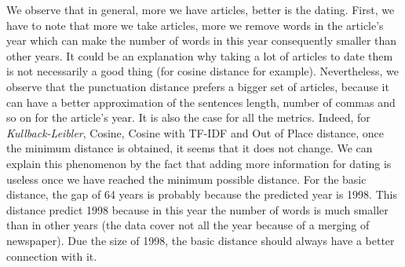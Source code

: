 We observe that in general, more we have articles, better is the dating. First, we have to note that more we take articles, more we remove words in the article's year which can make the number of words in this year consequently smaller than other years. It could be an explanation why taking a lot of articles to date them is not necessarily a good thing (for cosine distance for example). Nevertheless, we observe that the punctuation distance prefers a bigger set of articles, because it can have a better approximation of the sentences length, number of commas and so on for the article's year. It is also the case for all the metrics. Indeed, for \emph{Kullback-Leibler}, Cosine, Cosine with TF-IDF and Out of Place distance, once the minimum distance is obtained, it seems that it does not change. We can explain this phenomenon by the fact that adding more information for dating is useless once we have reached the minimum possible distance. For the basic distance, the gap of 64 years is probably because the predicted year is 1998. This distance predict 1998 because in this year the number of words is much smaller than in other years (the data cover not all the year because of a merging of newspaper). Due the size of 1998, the basic distance should always have a better connection with it.
